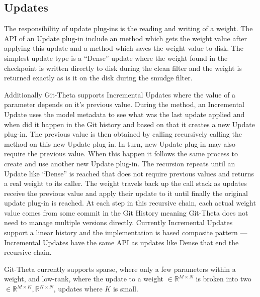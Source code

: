 
\subsection{Updates}

The responsibility of update plug-ins is the reading and writing of a weight. The API of an Update plug-in include an  method which gets the weight value after applying this update and a  method which saves the weight value to disk. The simplest update type is a ``Dense'' update where the weight found in the checkpoint is written directly to disk during the clean filter and the weight is returned exactly as is it on the disk during the smudge filter.

Additionally Git-Theta supports Incremental Updates where the value of a parameter depends on it's previous value. During the  method, an Incremental Update uses the model metadata to see what was the last update applied and when did it happen in the Git history and based on that it creates a new Update plug-in. The previous value is then obtained by calling recursively calling the  method on this new Update plug-in. In turn, new Update plug-in may also require the previous value. When this happen it follows the same process to create and use another new Update plug-in. The recursion repeats until an Update like ``Dense'' is reached that does not require previous values and returns a real weight to its caller. The weight travels back up the call stack as updates receive the previous value and apply their update to it until finally the original update plug-in is reached. At each step in this recursive chain, each actual weight value comes from some commit in the Git History meaning Git-Theta does not need to manage multiple versions directly. Currently Incremental Updates support a linear history and the implementation is based composite pattern ---Incremental Updates have the same API as updates like Dense that end the recursive chain.

Git-Theta currently supports sparse, where only a few parameters within a weight, and low-rank, where the update to a weight $\in \mathbb{R}^{M \times N}$ is broken into two $\in \mathbb{R}^{M \times K}, \mathbb{R}^{K \times N}$, updates where $K$ is small.

